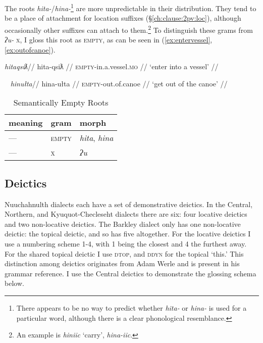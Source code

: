 The roots \textit{hita-}/\textit{hina-}\footnote{There appears to be no way to predict whether \textit{hita-} or \textit{hina-} is used for a particular word, although there is a clear phonological resemblance.} are more unpredictable in their distribution. They tend to be a place of attachment for location suffixes (\S\ref{ch:clause:2pv:loc}), although occasionally other suffixes can attach to them.\footnote{An example is \textit{hiniic} `carry', \textit{hina-iic}.} To distinguish these grams from \textit{ʔu-} \textsc{x}, I gloss this root as \textsc{empty}, as can be seen in (\ref{ex:entervessel}, \ref{ex:outofcanoe}).

\ex \label{ex:entervessel}
\begingl
\glpreamble \textit{hitaqsiƛ}//
\gla hita-qsiƛ //
\glb \textsc{empty}-in.a.vessel.\textsc{mo} //
\glft `enter into a vessel' //
\endgl
\xe

\ex~ \label{ex:outofcanoe}
\begingl
\glpreamble \textit{hinułta}//
\gla hina-ułta //
\glb \textsc{empty}-out.of.canoe //
\glft `get out of the canoe' //
\endgl
\xe

\begin{table}[ht]
\centering
\caption{Semantically Empty Roots}
\label{table:augdim}
\begin{tabular}{lll}
meaning                            & gram               & morph                                         \\ \hline
\multicolumn{1}{|l|}{---} & \multicolumn{1}{l|}{\textsc{empty}}   & \multicolumn{1}{l|}{\textit{hita}, \textit{hina}}                   \\ \hline
\multicolumn{1}{|l|}{---} & \multicolumn{1}{l|}{\textsc{x}}   & \multicolumn{1}{l|}{\textit{ʔu}}                   \\ \hline
\end{tabular}
\end{table}

\subsection{Deictics}

Nuuchahnulth dialects each have a set of demonstrative deictics. In the Central, Northern, and Kyuquot-Checleseht dialects there are six: four locative deictics and two non-locative deictics. The Barkley dialect only has one non-locative deictic: the topical deictic, and so has five altogether. For the locative deictics I use a numbering scheme 1-4, with 1 being the closest and 4 the furthest away. For the shared topical deictic I use \textsc{dtop}, and \textsc{ddyn} for the topical `this.' This distinction among deictics originates from Adam Werle and is present in his grammar reference. I use the Central deictics to demonstrate the glossing schema below.

